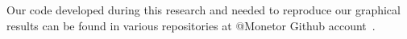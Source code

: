 
Our code developed during this research and needed to reproduce our
graphical results can be found in various repositories at @Monetor
Github account~\cite{monetor-github}.
